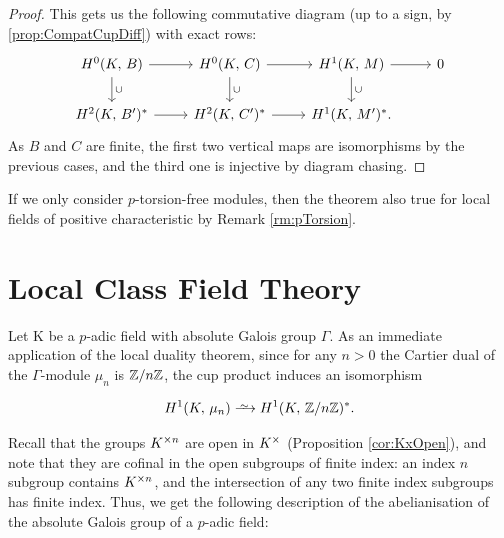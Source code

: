\documentclass[a4paper, oneside]{memoir}
\begin{document}
\begin{proof}
    This gets us the following commutative diagram (up to a sign, by \ref{prop:CompatCupDiff}) with exact rows:
    \[
        \begin{tikzcd}
            \H{0}{\K}{B} \ar[r] \ar[d, "\cup"] & \H{0}{\K}{C} \ar[r] \ar[d, "\cup"] & \H{1}{\K}{M} \ar[d, "\cup"] \ar[r] & 0 \\
            \H{2}{\K}{B^\prime}^* \ar[r] & \H{2}{\K}{C^\prime}^* \ar[r] & \H{1}{\K}{M^\prime}^*.
        \end{tikzcd}
    \]
    As \(B\) and \(C\) are finite, the first two vertical maps are isomorphisms by the previous cases, and the third one is injective by diagram chasing.

\end{proof}

\begin{remark}
    If we only consider $p$-torsion-free modules, then the theorem also true for local fields of positive characteristic by Remark \ref{rm:pTorsion}.
\end{remark}

\section{Local Class Field Theory}

Let K be a $p$-adic field with absolute Galois group $\Gamma$. As an immediate application of the local duality theorem, since for any $n>0$ the Cartier dual of the $\Gamma$-module $\mu_n$ is $\mathbb{Z}/n\mathbb{Z}$, the cup product induces an isomorphism


\begin{equation}\label{eq:CupIso}
    \H{1}{K}{\mu_n} \Iso \H{1}{K}{\Zn}^*.
\end{equation}

Recall that the groups $K^{\times n}$ are open in $K^\times$ (Proposition \ref{cor:KxOpen}), and note that they are cofinal in the open subgroups of finite index: an index $n$ subgroup contains $K^{\times n}$, and the intersection of any two finite index subgroups has finite index. Thus, we get the following description of the abelianisation of the absolute Galois group of a $p$-adic field:
\end{document}
